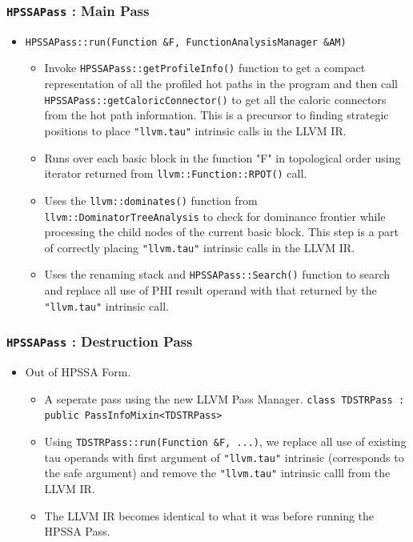 \documentclass{beamer}
\begin{document}
\begin{frame}
	\frametitle{\texttt{HPSSAPass} : Main Pass}
	\begin{itemize}
		\item \texttt{HPSSAPass::run(Function \&F, FunctionAnalysisManager \&AM)} 
		\begin{itemize}
			\footnotesize
			\item Invoke \texttt{HPSSAPass::getProfileInfo()} function to get a compact representation of all the profiled \color{red} hot paths \color{black} in the program and then call \texttt{HPSSAPass::getCaloricConnector()} to get all the caloric connectors from the \color{red} hot path \color{black} information. This is a precursor to finding strategic positions to place \texttt{"llvm.tau"} intrinsic calls in the LLVM IR.
			\item Runs over each basic block in the function "F" in topological order using iterator returned from \texttt{llvm::Function::RPOT()} call.
			\item Uses the \texttt{llvm::dominates()} function from \texttt{llvm::DominatorTreeAnalysis} to check for dominance frontier while processing the child nodes of the current basic block. This step is a part of correctly placing \texttt{"llvm.tau"} intrinsic calls in the LLVM IR. 
			\item Uses the renaming stack and \texttt{HPSSAPass::Search()} function to search and replace all use of PHI result operand with that returned by the \texttt{"llvm.tau"} intrinsic call.
		\end{itemize}
	\end{itemize}
\end{frame}

\begin{frame}
	\frametitle{\texttt{HPSSAPass} : Destruction Pass}
	\begin{itemize}
		\item Out of HPSSA Form. 
		\begin{itemize}
			\item A seperate pass using the new LLVM Pass Manager. \texttt{class TDSTRPass : public PassInfoMixin<TDSTRPass>}
			\item Using \texttt{TDSTRPass::run(Function \&F, ...)}, we replace all use of existing tau operands with first argument of  \texttt{"llvm.tau"} intrinsic (corresponds to the safe argument) and remove the \texttt{"llvm.tau"} intrinsic calll from the LLVM IR.
			\item The LLVM IR becomes identical to what it was before running the HPSSA Pass. 
		\end{itemize}
	\end{itemize}
\end{frame}
\end{document}
